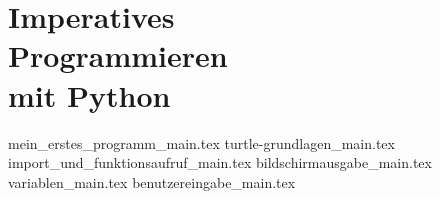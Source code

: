 
\part[Imperatives Programmieren mit Python]{Imperatives \\ Programmieren \\ mit Python}
\label{part-programmieren-mit-python}

{mein_erstes_programm_main.tex}
{turtle-grundlagen_main.tex}
{import_und_funktionsaufruf_main.tex}
{bildschirmausgabe_main.tex}
{variablen_main.tex}
{benutzereingabe_main.tex}

